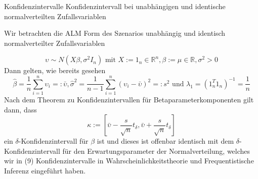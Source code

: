 \documentclass[
  8pt,
  ignorenonframetext,
]{beamer}
\begin{document}
\begin{frame}{Konfidenzintervalle}
\protect\hypertarget{konfidenzintervalle-3}{}
Konfidenzintervall bei unabhängigen und identische normalverteilten
Zufallsvariablen

\footnotesize

Wir betrachten die ALM Form des Szenarios unabhängig und identisch
normalverteilter Zufallsvariablen

\begin{equation}
\upsilon \sim N(X\beta,\sigma^2I_n) \mbox{ mit }  X := 1_{n} \in \mathbb{R}^n, \beta := \mu \in \mathbb{R},\sigma^2 > 0
\end{equation} Dann gelten, wie bereits gesehen \begin{equation}
\hat{\beta} = \frac{1}{n}\sum_{i=1}^n \upsilon_i =: \bar{\upsilon},
\hat{\sigma}^2 = \frac{1}{n-1}\sum_{i=1}^n(\upsilon_i-\bar{\upsilon})^2 =: s^2 \mbox{ und }
\lambda_1 = \left(1_n^T1_n\right)^{-1} = \frac{1}{n}
\end{equation} Nach dem Theorem zu Konfidenzintervallen für
Betaparameterkomponenten gilt dann, dass \begin{equation}
\kappa := \left[\bar{\upsilon} - \frac{s}{\sqrt{n}}t_{\delta}, \bar{\upsilon} + \frac{s}{\sqrt{n}}t_{\delta}\right]
\end{equation} ein \(\delta\)-Konfidenzintervall für \(\beta\) ist und
dieses ist offenbar identisch mit dem \(\delta\)-Konfidenzintervall für
den Erwartungsparameter der Normalverteilung, welches wir in (9)
Konfidenzintervalle in Wahrscheinlichkeitstheorie und Frequentistische
Inferenz eingeführt haben.
\end{frame}
\end{document}
